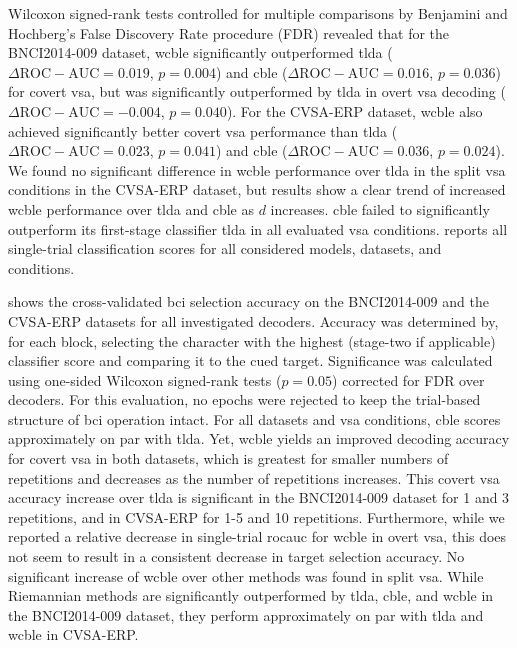 Wilcoxon signed-rank tests controlled for multiple comparisons by Benjamini
and Hochberg's False Discovery Rate procedure (FDR) revealed that
for the BNCI2014-009 dataset, \ac{wcble} significantly outperformed \ac{tlda}
($\Delta\mathrm{ROC-AUC} = 0.019$, $p=0.004$) and \ac{cble}
($\Delta\mathrm{ROC-AUC} = 0.016$, $p=0.036$) for covert \ac{vsa},
but was significantly outperformed by \ac{tlda} in overt \ac{vsa} decoding
($\Delta\mathrm{ROC-AUC}=-0.004$, $p=0.040$).
For the CVSA-ERP dataset, \ac{wcble}
also achieved significantly better covert \ac{vsa} performance than \ac{tlda} ($\Delta\mathrm{ROC-AUC}
	= 0.023$, $p=0.041$) and \ac{cble} ($\Delta\mathrm{ROC-AUC}
	= 0.036$, $p=0.024$).
We found no significant difference in \ac{wcble} performance over \ac{tlda} in the split
\ac{vsa} conditions in the CVSA-ERP dataset, but results show a clear trend of
increased \ac{wcble} performance over \ac{tlda} and \ac{cble} as $d$ increases.
\ac{cble} failed to significantly outperform its first-stage classifier \ac{tlda} in all
evaluated \ac{vsa} conditions.
 reports all single-trial classification scores for all considered models, datasets, and conditions.

 shows the cross-validated \ac{bci} selection
accuracy on the BNCI2014-009 and the CVSA-ERP datasets for all investigated
decoders.
Accuracy was determined by, for each block, selecting the character with the
highest (stage-two if applicable) classifier score and comparing it to the cued target.
Significance was calculated using one-sided Wilcoxon signed-rank tests ($p=0.05$)
corrected for FDR over decoders.
For this evaluation, no epochs were rejected to keep the trial-based structure
of \ac{bci} operation intact.
For all datasets and \ac{vsa} conditions, \ac{cble} scores approximately on par with \ac{tlda}.
Yet, \ac{wcble} yields an improved decoding accuracy for covert \ac{vsa} in both
datasets, which is greatest for smaller numbers of repetitions and
decreases as the number of repetitions increases.
This covert \ac{vsa} accuracy increase over \ac{tlda} is significant in the
BNCI2014-009 dataset for 1 and 3 repetitions, and in CVSA-ERP for 1-5 and 10 repetitions.
Furthermore, while we reported a relative decrease in single-trial \ac{rocauc} for
\ac{wcble} in overt \ac{vsa}, this does not seem to result in a consistent decrease in target
selection accuracy.
No significant increase of \ac{wcble} over other methods was found in split \ac{vsa}.
While Riemannian methods are significantly outperformed by \ac{tlda}, \ac{cble}, and \ac{wcble}
in the BNCI2014-009 dataset, they perform approximately on par with \ac{tlda} and
\ac{wcble} in CVSA-ERP.

